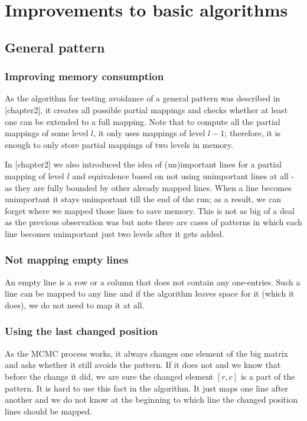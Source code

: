 \chapter{Improvements to basic algorithms}
\label{chap:imp}

\section{General pattern}

\subsection{Improving memory consumption}
As the algorithm for testing avoidance of a general pattern was described in [chapter2], it creates all possible partial mappings and checks whether at least one can be extended to a full mapping. Note that to compute all the partial mappings of some level $l$, it only uses mappings of level $l-1$; therefore, it is enough to only store partial mappings of two levels in memory.

In [chapter2] we also introduced the idea of (un)important lines for a partial mapping of level $l$ and equivalence based on not using unimportant lines at all - as they are fully bounded by other already mapped lines. When a line becomes unimportant it stays unimportant till the end of the run; as a result, we can forget where we mapped those lines to save memory. This is not as big of a deal as the previous observation was but note there are cases of patterns in which each line becomes unimportant just two levels after it gets added.

\subsection{Not mapping empty lines}
An empty line is a row or a column that does not contain any one-entries. Such a line can be mapped to any line and if the algorithm leaves space for it (which it does), we do not need to map it at all.

\subsection{Using the last changed position}
As the MCMC process works, it always changes one element of the big matrix and asks whether it still avoids the pattern. If it does not and we know that before the change it did, we are sure the changed element $[r,c]$ is a part of the pattern. It is hard to use this fact in the algorithm. It just maps one line after another and we do not know at the beginning to which line the changed position lines should be mapped.

